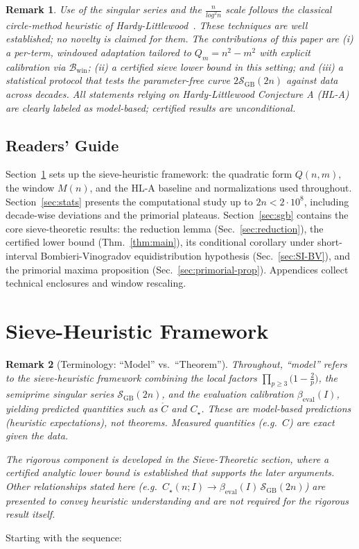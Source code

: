 \documentclass[11pt]{article}
\theoremstyle{inline}
\newtheorem*{remark}{Remark}
\theoremstyle{break}
\theoremstyle{break}
\theoremstyle{break}
\theoremstyle{break}
\theoremstyle{break}
\theoremstyle{break}
\theoremstyle{break}
\theoremstyle{inline}
\newcommand{\twin}{{\scriptscriptstyle\mathrm{win}}}
\newcommand{\Cmeas}{C}              %
\newcommand{\Cpred}{\mathring{C}}   %
\newcommand{\SGB}{\mathcal{S}_{\scriptscriptstyle\mathrm{GB}}}
\newcommand{\Bwin}{\mathcal{B}_\twin}
\newcommand{\betacal}{\beta_{\mathrm{eval}}}
\begin{document}
\begin{remark}
Use of the singular series and the \(  \frac{n}{log^2 n} \) scale follows the classical circle-method heuristic of Hardy-Littlewood~\cite{HardyLittlewood1923}.  These techniques are well established; no novelty is claimed for them. The contributions of this paper are (i) a per-term, windowed adaptation tailored to \( Q_m = n^2 - m^2 \)  with explicit calibration via \( \Bwin \); (ii) a certified sieve lower bound in this setting; and (iii) a statistical protocol that tests the parameter-free curve \( 2\SGB(2n) \) against data across decades. All statements relying on Hardy-Littlewood Conjecture A (HL-A) are clearly labeled as model-based; certified results are unconditional.
\end{remark}


\subsection{Readers’ Guide}
Section~\ref{sec:framework} sets up the sieve-heuristic framework: the quadratic form \(Q(n,m)\), the window \(M(n)\), and the HL-A baseline and normalizations used throughout. 
Section~\ref{sec:stats} presents the computational study up to \(2n<2\cdot 10^8\), including decade-wise deviations and the primorial plateaus.
Section~\ref{sec:sgb} contains the core sieve-theoretic results: the reduction lemma (Sec.~\ref{sec:reduction}), the certified lower bound (Thm.~\ref{thm:main}), its conditional corollary under short-interval Bombieri-Vinogradov equidistribution hypothesis (Sec.~\ref{sec:SI-BV}), and the primorial maxima proposition (Sec.~\ref{sec:primorial-prop}).
Appendices collect technical enclosures and window rescaling.


\section{Sieve-Heuristic Framework}\label{sec:framework}

\begin{remark}[Terminology: ``Model'' vs.\ ``Theorem'']
Throughout, ``model'' refers to the sieve-heuristic framework combining the local
factors \( \prod_{p\ge3}\!\bigl(1-\tfrac{2}{p}\bigr) \), the semiprime singular series
\( \SGB(2n) \), and the evaluation calibration \( \betacal(I) \), yielding
predicted quantities such as \( \Cpred \) and \( C_\star \). These are
\emph{model-based predictions} (heuristic expectations), not theorems.
Measured quantities (e.g.\ \( \Cmeas \)) are exact given the data.

The rigorous component is developed in the Sieve-Theoretic section, where a certified analytic lower bound is established that supports the later arguments.
Other relationships stated here (e.g.\ \( C_\star(n;I)\to \betacal(I)\,\SGB(2n) \))
are presented to convey heuristic understanding and are not required
for the rigorous result itself.
\end{remark}
Starting with the sequence:
\end{document}
